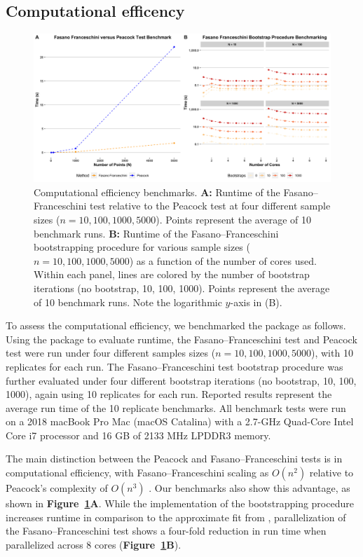 \documentclass[codesnippet]{jss}
\begin{document}
\subsection{Computational efficency}

\begin{figure}[hbt]
\centering
\includegraphics{benchmark}
\caption{\label{fig:bmark} Computational efficiency benchmarks.
\textbf{A:} Runtime of the
Fasano--Franceschini test relative to the Peacock test at four different sample sizes
($n=10, 100, 1000, 5000$).  Points represent the
average of 10 benchmark runs. \textbf{B:} Runtime of the
Fasano--Franceschini bootstrapping procedure for various sample sizes
($n= 10, 100, 1000, 5000$) as a function of the number of cores used. Within each panel,
lines are colored by the number of bootstrap iterations (no bootstrap, 10, 100,
1000). Points represent the average of 10 benchmark runs. Note the logarithmic $y$-axis
in (B).}
\end{figure}

To assess the computational efficiency, we benchmarked the package as follows.
Using the  package to evaluate runtime, the Fasano--Franceschini
test and Peacock test were run under four different samples sizes
($n=10, 100, 1000, 5000$), with 10 replicates for each run. The
Fasano--Franceschini test bootstrap procedure was further evaluated
under four different bootstrap iterations (no bootstrap, 10, 100, 1000),
again using 10 replicates for each run. Reported results represent the
average run time of the 10 replicate benchmarks. All benchmark tests were run on a 2018 macBook
Pro Mac (macOS Catalina) with a 2.7-GHz Quad-Core Intel Core i7 processor and 16 GB of 2133 MHz LPDDR3 memory.

The main distinction between the Peacock and Fasano--Franceschini
tests is in computational efficiency, with  Fasano--Franceschini
scaling as $O(n^2)$ relative to Peacock's complexity of  $O(n^3)$
\citep{Lopes2007}.  Our benchmarks also show this advantage, as shown
in \textbf{Figure~\ref{fig:bmark}A}.  While the implementation of the
bootstrapping procedure increases runtime in comparison to the
approximate fit from  \citet{numericalRecipes}, parallelization of the
Fasano--Franceschini test shows a four-fold reduction in run time when
parallelized across 8 cores (\textbf{Figure~\ref{fig:bmark}B}).
\end{document}
